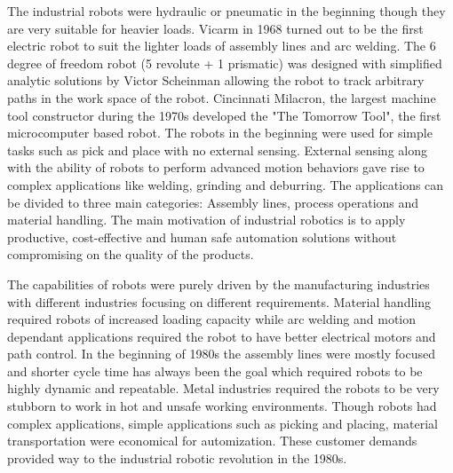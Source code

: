 The industrial robots were hydraulic or pneumatic in the beginning though they are very suitable for heavier loads. Vicarm in 1968 turned out to be the first electric robot to suit the lighter loads of assembly lines and arc welding. The 6 degree of freedom robot (5 revolute + 1 prismatic) was designed with simplified analytic solutions by Victor Scheinman allowing the robot to track arbitrary paths in the work space of the robot. Cincinnati Milacron, the largest machine tool constructor during the 1970s developed the "The Tomorrow Tool", the first microcomputer based robot. The robots in the beginning were used for simple tasks such as pick and place with no external sensing. External sensing along with the ability of robots to perform advanced motion behaviors gave rise to complex applications like welding, grinding and deburring. The applications can be divided to three main categories: Assembly lines, process operations and material handling. The main motivation of industrial robotics is to apply productive, cost-effective and human safe automation solutions without compromising on the quality of the products. 


The capabilities of robots were purely driven by the manufacturing industries with different industries focusing on different requirements. Material handling required robots of increased loading capacity while arc welding and motion dependant applications required the robot to have better electrical motors and path control. In the beginning of 1980s the assembly lines were mostly focused and shorter cycle time has always been the goal which required robots to be highly dynamic and repeatable. Metal industries required the robots to be very stubborn to work in hot and unsafe working environments. Though robots had complex applications, simple applications such as picking and placing, material transportation were economical for automization. 
These customer demands provided way to the industrial robotic revolution in the 1980s. 


